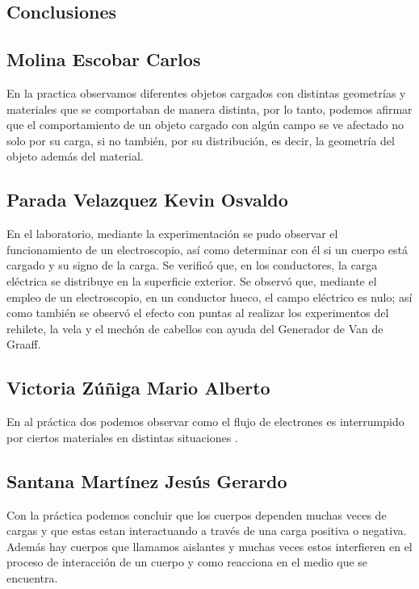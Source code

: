 \documentclass[11pt]{article}
\begin{document}
\begin{multicols}{2}
\section{Conclusiones}

\subsection{Molina Escobar Carlos}

En la practica observamos diferentes objetos cargados con distintas geometrías y materiales que se comportaban de manera distinta, por lo tanto, podemos afirmar que el comportamiento de un objeto cargado con algún campo se ve afectado no solo por su carga, si no también, por su distribución, es decir, la geometría del objeto además del material.

\subsection{Parada Velazquez Kevin Osvaldo}
En el laboratorio, mediante la experimentación se pudo observar el funcionamiento de un electroscopio, así como determinar con él si un cuerpo está cargado y su signo de la carga. Se verificó que, en los conductores, la carga eléctrica se distribuye en la superficie exterior.
Se observó que, mediante el empleo de un electroscopio, en un conductor hueco, el campo eléctrico es nulo; así como también se observó el efecto con puntas al realizar los experimentos del rehilete, la vela y el mechón de cabellos con ayuda del Generador de Van de Graaff.


\subsection{Victoria Zúñiga Mario Alberto}
En al práctica dos podemos observar como el flujo de electrones es interrumpido por ciertos materiales en distintas situaciones .


\subsection{Santana Martínez Jesús Gerardo}

Con la práctica podemos concluir que los cuerpos dependen muchas veces de cargas y que estas estan interactuando a través de una carga positiva o negativa.
Además hay cuerpos que llamamos aislantes y muchas veces estos interfieren en el proceso de interacción de un cuerpo y como reacciona en el medio que se encuentra.


\end{multicols}
\end{document}
